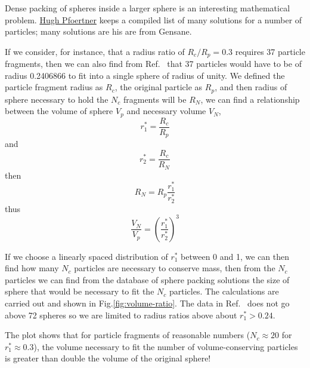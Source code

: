 Dense packing of spheres inside a larger sphere is an interesting mathematical problem. \href{http://www.randomwalk.de/sphere/insphr/spisbest.txt}{Hugh Pfoertner} keeps a compiled list of many solutions for a number of particles; many solutions are his are from Gensane.\cite{gensane2003dense}

If we consider, for instance, that a radius ratio of $R_c/R_p = 0.3$ requires 37 particle fragments, then we can also find from Ref.~\cite{gensane2003dense} that 37 particles would have to be of radius 0.2406866 to fit into a single sphere of radius of unity. We defined the particle fragment radius as $R_c$, the original particle as $R_p$, and then radius of sphere necessary to hold the $N_c$ fragments will be $R_N$, we can find a relationship between the volume of sphere $V_p$ and necessary volume $V_N$,
\begin{equation}
	r_1^* = \frac{R_c}{R_p}
\end{equation}
and
\begin{equation}
	r_2^* = \frac{R_c}{R_N}
\end{equation}
then 
\begin{equation}
	R_N = R_p \frac{r_1^*}{r_2^*}
\end{equation}
thus
\begin{equation}
	\frac{V_N}{V_p} = \left(\frac{r_1^*}{r_2^*}\right)^3
\end{equation}

If we choose a linearly spaced distribution of $r_1^*$ between 0 and 1, we can then find how many $N_c$ particles are necessary to conserve mass, then from the $N_c$ particles we can find from the database of sphere packing solutions the size of sphere that would be necessary to fit the $N_c$ particles. The calculations are carried out and shown in Fig.\ref{fig:volume-ratio}. The data in Ref.~\cite{gensane2003dense} does not go above 72 spheres so we are limited to radius ratios above about $r_1^* > 0.24$.

The plot shows that for particle fragments of reasonable numbers ($N_c\approx 20$ for $r_1^*\approx 0.3$), the volume necessary to fit the number of volume-conserving particles is greater than double the volume of the original sphere! 

